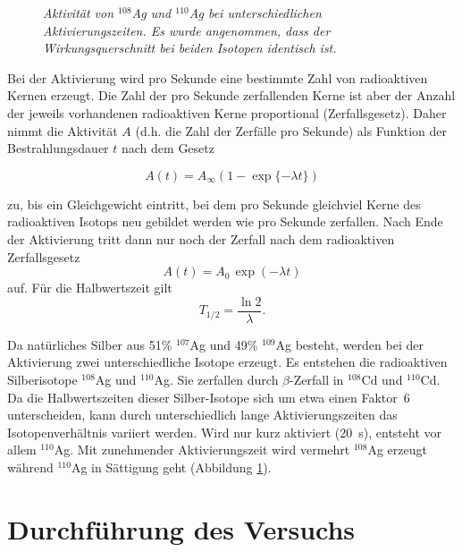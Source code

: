 \documentclass[landscape,twocolumn]{article}
\begin{document}
\begin{figure}[h]
\begin{minipage}[c]{12cm}
\centering{}
\caption{\label{252_ag}\fontsize{10}{12}\it Aktivit\"{a}t von $^{108}$Ag und $^{110}$Ag bei unterschiedlichen Aktivierungszeiten. Es wurde angenommen, dass der
Wirkungsquerschnitt bei beiden Isotopen identisch ist.}
\end{minipage}
\end{figure}

Bei der Aktivierung wird pro Sekunde eine bestimmte Zahl von
radioaktiven Kernen erzeugt. Die Zahl der pro Sekunde zerfallenden
Kerne ist aber der Anzahl der jeweils vorhandenen radioaktiven
Kerne proportional (Zerfallsgesetz). Daher nimmt die Aktivit\"{a}t $A$
(d.h. die Zahl der Zerf\"{a}lle pro Sekunde) als Funktion der
Bestrahlungsdauer $t$ nach dem Gesetz

\begin{equation}
A(t) = A_\infty (1 - \exp\{ - \lambda t\} )
\end{equation}

zu, bis ein Gleichgewicht eintritt, bei dem pro Sekunde gleichviel
Kerne des radioaktiven Isotops neu gebildet werden wie pro Sekunde
zerfallen. Nach Ende der Aktivierung tritt dann nur noch der
Zerfall nach dem radioaktiven Zerfallsgesetz
\begin{equation}
A(t) = A_0\, \exp{( - \lambda t)}
\end{equation}
auf. F\"{u}r die Halbwertszeit gilt
\begin{equation}
T_{1/2} =\frac{\ln 2}{\lambda}.
\end{equation}


Da nat\"{u}rliches Silber aus 51\% $^{107}$Ag und
49\% $^{109}$Ag besteht, werden bei der Aktivierung  zwei unterschiedliche Isotope erzeugt. Es entstehen die radioaktiven
Silberisotope $^{108}$Ag und $^{110}$Ag. Sie zerfallen durch $\beta$-Zerfall in $^{108}$Cd und $^{110}$Cd. Da die Halbwertszeiten dieser Silber-Isotope sich
um etwa einen Faktor~6 unterscheiden, kann durch unterschiedlich lange Aktivierungszeiten das Isotopenverh\"{a}ltnis variiert werden. Wird nur kurz aktiviert (20~s),
entsteht vor allem $^{110}$Ag. Mit zunehmender Aktivierungszeit wird vermehrt $^{108}$Ag erzeugt w\"{a}hrend $^{110}$Ag in S\"{a}ttigung geht (Abbildung \ref{252_ag}).

\section{Durchf\"{u}hrung des Versuchs}
\end{document}
